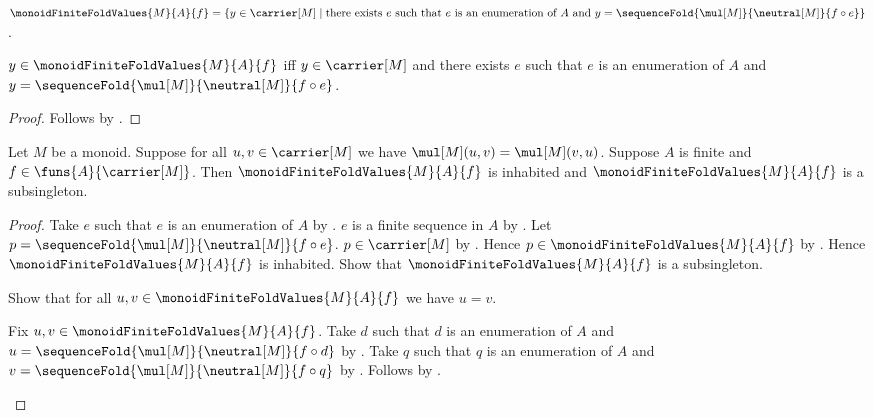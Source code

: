 \begin{definition}\label{monoid_finite_fold_values}
    $\monoidFiniteFoldValues{M}{A}{f}=
        \{y\in\carrier[M]\mid
            \text{there exists $e$ such that
                $e$ is an enumeration of $A$ and
                $y=\sequenceFold{\mul[M]}{\neutral[M]}{f\circ e}$}\}$.
\end{definition}

\begin{proposition}\label{monoid_finite_fold_values_iff}
    $y\in\monoidFiniteFoldValues{M}{A}{f}$ iff
        $y\in\carrier[M]$ and there exists $e$ such that
            $e$ is an enumeration of $A$ and
            $y=\sequenceFold{\mul[M]}{\neutral[M]}{f\circ e}$.
\end{proposition}
\begin{proof}
    Follows by .
\end{proof}

\begin{theorem}\label{monoid_finite_fold_values_inhabited_subsingleton}
    Let $M$ be a monoid.
    Suppose for all $u,v\in\carrier[M]$ we have
        $\mul[M](u,v)=\mul[M](v,u)$.
    Suppose $A$ is finite and $f\in\funs{A}{\carrier[M]}$.
    Then $\monoidFiniteFoldValues{M}{A}{f}$ is inhabited and
        $\monoidFiniteFoldValues{M}{A}{f}$ is a subsingleton.
\end{theorem}
\begin{proof}
    Take $e$ such that $e$ is an enumeration of $A$ by
        .
    $e$ is a finite sequence in $A$ by
        .
    Let $p=\sequenceFold{\mul[M]}{\neutral[M]}{f\circ e}$.
    $p\in\carrier[M]$ by .
    Hence $p\in\monoidFiniteFoldValues{M}{A}{f}$ by
        .
    Hence $\monoidFiniteFoldValues{M}{A}{f}$ is inhabited.
    Show that $\monoidFiniteFoldValues{M}{A}{f}$ is a subsingleton.
    \begin{subproof}
        Show that for all $u,v\in\monoidFiniteFoldValues{M}{A}{f}$
            we have $u=v$.
        \begin{subproof}
            Fix $u,v\in\monoidFiniteFoldValues{M}{A}{f}$.
            Take $d$ such that $d$ is an enumeration of $A$ and
                $u=\sequenceFold{\mul[M]}{\neutral[M]}{f\circ d}$ by
                .
            Take $q$ such that $q$ is an enumeration of $A$ and
                $v=\sequenceFold{\mul[M]}{\neutral[M]}{f\circ q}$ by
                .
            Follows by .
        \end{subproof}
    \end{subproof}
\end{proof}

